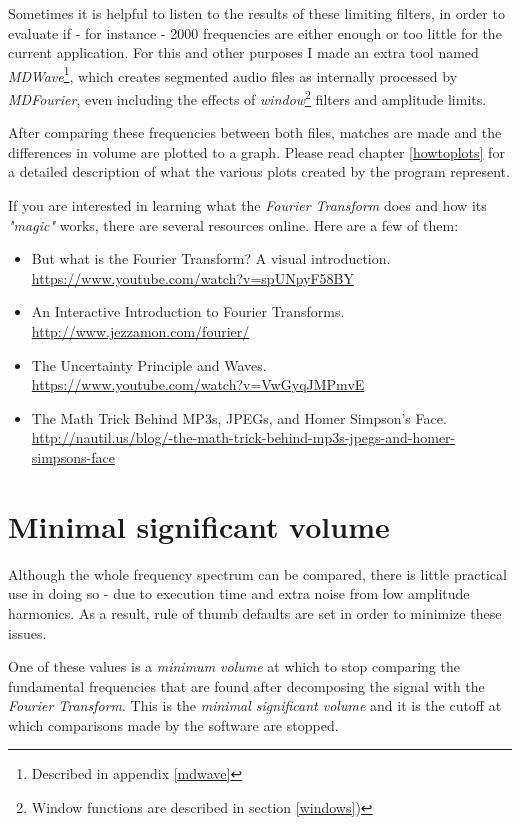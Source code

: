 \documentclass[10pt,a4paper]{report}
\begin{document}
Sometimes it is helpful to listen to the results of these limiting filters, in order to evaluate if - for instance - 2000 frequencies are either enough or too little for the current application. For this and other purposes I made an extra tool named \textit{MDWave}\footnote{Described in appendix \ref{mdwave}}, which creates segmented audio files as internally processed by \textit{MDFourier}, even including the effects of \textit{window}\footnote{Window functions are described in section \ref{windows})} filters and amplitude limits.

After comparing these frequencies between both files, matches are made and the differences in volume are plotted to a graph. Please read chapter \ref{howtoplots} for a detailed description of what the various plots created by the program represent.

If you are interested in learning what the \textit{Fourier Transform} does and how its \textit{"magic"} works, there are several resources online. Here are a few of them:

\begin{itemize}
	\item But what is the Fourier Transform? A visual introduction.\\ \url{https://www.youtube.com/watch?v=spUNpyF58BY}
	\item An Interactive Introduction to Fourier Transforms.\\ \url{http://www.jezzamon.com/fourier/}
	\item The Uncertainty Principle and Waves.\\
	\url{https://www.youtube.com/watch?v=VwGyqJMPmvE}
	\item The Math Trick Behind MP3s, JPEGs, and Homer Simpson’s Face.\\
	\url{http://nautil.us/blog/-the-math-trick-behind-mp3s-jpegs-and-homer-simpsons-face}
\end{itemize}

\section{Minimal significant volume}
\label{MinSigVolume}

Although the whole frequency spectrum can be compared, there is little practical use in doing so -  due to execution time and extra noise from low amplitude harmonics. As a result, rule of thumb defaults are set in order to minimize these issues.

One of these values is a \textit{minimum volume} at which to stop comparing the fundamental frequencies that are found after decomposing the signal with the \textit{Fourier Transform}. This is the \textit{minimal significant volume} and it is the cutoff at which comparisons made by the software are stopped.
\end{document}

